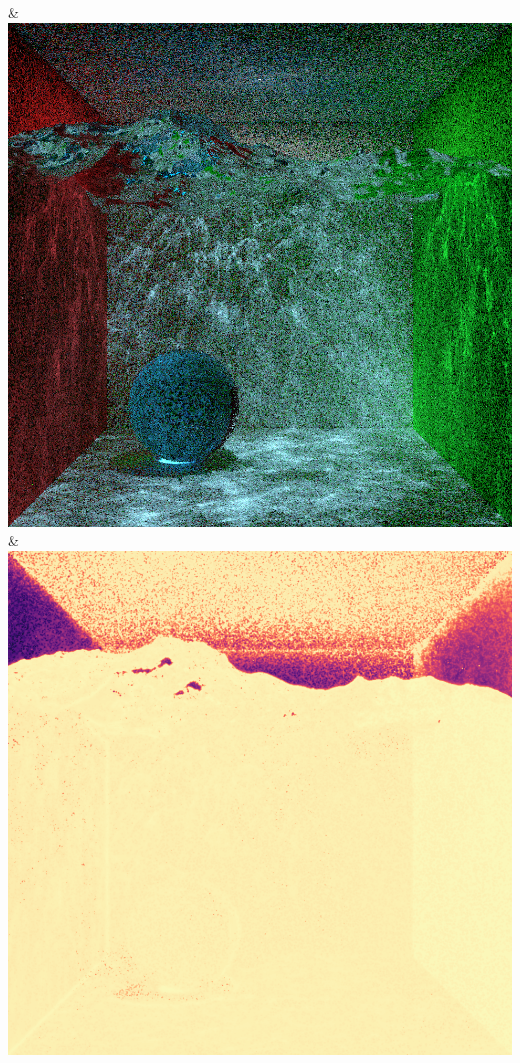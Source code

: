 & \includegraphics[width=\linewidth]{figures/py/tests/quality_comparison/sppm_1spp_caustics_small.png}
\\
& \includegraphics[width=\linewidth]{figures/py/tests/quality_comparison/pt_1spp_caustics_small_flip.png}
